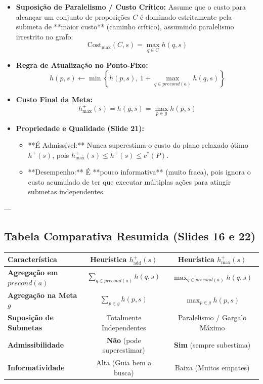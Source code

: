 \documentclass[a4paper,12pt]{article}
\begin{document}
\begin{itemize}
	\item \textbf{Suposição de Paralelismo / Custo Crítico:}
	Assume que o custo para alcançar um conjunto de proposições $C$ é dominado estritamente pela submeta de **maior custo** (caminho crítico), assumindo paralelismo irrestrito no grafo:
	\begin{equation}
		\text{Cost}_{\text{max}}(C, s) = \max_{q \in C} h(q, s)
	\end{equation}
	\item \textbf{Regra de Atualização no Ponto-Fixo:}
	\begin{equation}
		h(p, s) \leftarrow \min \left\{ h(p, s), \, 1 + \max_{q \in precond(a)} h(q, s) \right\}
	\end{equation}
	\item \textbf{Custo Final da Meta:}
	\begin{equation}
		h_{\text{max}}^+(s) = h(g, s) = \max_{p \in g} h(p, s)
	\end{equation}
	\item \textbf{Propriedade e Qualidade (Slide 21):}
	\begin{itemize}
		\item **É Admissível:** Nunca superestima o custo do plano relaxado ótimo $h^+(s)$, pois $h_{\text{max}}^+(s) \le h^+(s) \le c^*(P)$.
		\item **Desempenho:** É **pouco informativa** (muito fraca), pois ignora o custo acumulado de ter que executar múltiplas ações para atingir submetas independentes.
	\end{itemize}
\end{itemize}

---

\subsection*{Tabela Comparativa Resumida (Slides 16 e 22)}

\begin{center}
	\begin{tabular}{|l|c|c|}
		\hline
		\textbf{Característica} & \textbf{Heurística $h_{\text{add}}^+(s)$} & \textbf{Heurística $h_{\text{max}}^+(s)$} \\ \hline
		\textbf{Agregação em $precond(a)$} & $\sum_{q \in precond(a)} h(q, s)$ & $\max_{q \in precond(a)} h(q, s)$ \\ \hline
		\textbf{Agregação na Meta $g$} & $\sum_{p \in g} h(p, s)$ & $\max_{p \in g} h(p, s)$ \\ \hline
		\textbf{Suposição de Submetas} & Totalmente Independentes & Paralelismo / Gargalo Máximo \\ \hline
		\textbf{Admissibilidade} & \textbf{Não} (pode superestimar) & \textbf{Sim} (sempre subestima) \\ \hline
		\textbf{Informatividade} & Alta (Guia bem a busca) & Baixa (Muitos empates) \\ \hline
	\end{tabular}
\end{center}
\end{document}
